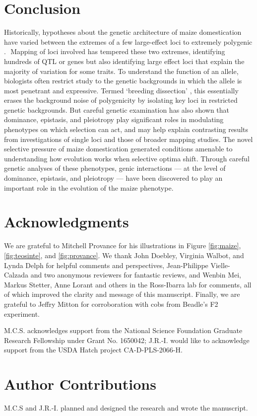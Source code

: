\documentclass[a4paper]{article}
\begin{document}
\section*{Conclusion}

﻿Historically, hypotheses about the genetic architecture of maize domestication have varied between the extremes of a few large-effect loci \citep{beadle1939, mangelsdorf1939} to extremely polygenic \citep{iltis1983}.
﻿ Mapping of loci involved has tempered these two extremes, identifying hundreds of QTL \citep{briggs2007} or genes \citep{wright2005, hufford2012natgen} but also identifying large effect loci that explain the majority of variation for some traits.
To understand the function of an allele,  biologists often restrict study to the genetic backgrounds in which the allele is most penetrant and expressive.
Termed `breeding dissection' \citep{wilkes2004}, this essentially erases the background noise of polygenicity by isolating key loci in restricted genetic backgrounds.
﻿But careful genetic examination has also shown that dominance, epistasis, and pleiotropy play significant roles in modulating phenotypes on which selection can act, and may help explain contrasting results from investigations of single loci and those of broader mapping studies.
﻿The novel selective pressure of maize domestication generated conditions amenable to understanding how evolution works when selective optima shift.
Through careful genetic analyses of these phenotypes, genic interactions --- at the level of dominance, epistasis, and pleiotropy --- have been discovered to play an important role in the evolution of the maize phenotype.


 \section*{Acknowledgments}
﻿We are grateful to Mitchell Provance for his illustrations in Figure \ref{fig:maize}, \ref{fig:teosinte}, and \ref{fig:provance}.
We thank John Doebley, Virginia Walbot, and Lynda Delph for helpful comments and perspectives, Jean-Philippe Vielle-Calzada and two anonymous reviewers for fantastic reviews, and Wenbin Mei, Markus Stetter, Anne Lorant and others in the Ross-Ibarra lab for comments, all of which improved the clarity and message of this manuscript.
﻿Finally, we are grateful to Jeffry Mitton for corroboration with cobs from Beadle's F2 experiment.

M.C.S. acknowledges support from the National Science Foundation Graduate Research Fellowship under Grant No. 1650042; J.R.-I. would like to acknowledge support from the USDA Hatch project CA-D-PLS-2066-H.

\section*{Author Contributions}
M.C.S and J.R.-I. planned and designed the research and wrote the manuscript.

 
 
\end{document}
